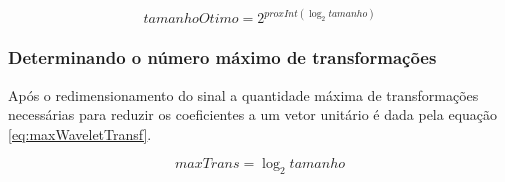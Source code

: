 \begin{myenv}{1.5}
					\begin{equation}
						tamanhoOtimo=2^{proxInt(\log_{2}tamanho)}
						\label{eq:optimalSize}
					\end{equation} 
				
				\subsubsection{Determinando o número máximo de transformações}
					\par Após o redimensionamento do sinal a quantidade máxima de transformações necessárias para reduzir os coeficientes a um vetor unitário é dada pela equação \ref{eq:maxWaveletTransf}. 
					
					\begin{equation}
						maxTrans=\log_{2}tamanho
						\label{eq:maxWaveletTransf}
					\end{equation}
	

\end{myenv}
